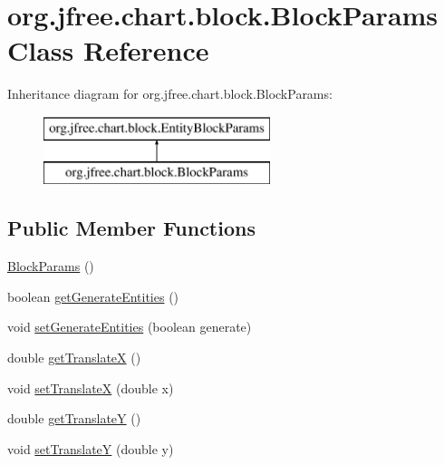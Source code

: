 \hypertarget{classorg_1_1jfree_1_1chart_1_1block_1_1_block_params}{}\section{org.\+jfree.\+chart.\+block.\+Block\+Params Class Reference}
\label{classorg_1_1jfree_1_1chart_1_1block_1_1_block_params}
Inheritance diagram for org.\+jfree.\+chart.\+block.\+Block\+Params\+:\begin{figure}[H]
\begin{center}
\leavevmode
\includegraphics[height=2.000000cm]{classorg_1_1jfree_1_1chart_1_1block_1_1_block_params}
\end{center}
\end{figure}
\subsection*{Public Member Functions}
\begin{DoxyCompactItemize}
\item 
\mbox{\hyperlink{classorg_1_1jfree_1_1chart_1_1block_1_1_block_params_a274dfbe74df7b75505cec4eb456b328c}{Block\+Params}} ()
\item 
boolean \mbox{\hyperlink{classorg_1_1jfree_1_1chart_1_1block_1_1_block_params_a5e6834d032c280d81a98ce45f615d231}{get\+Generate\+Entities}} ()
\item 
void \mbox{\hyperlink{classorg_1_1jfree_1_1chart_1_1block_1_1_block_params_a66ea957ee6b80277218fc7fa382026a4}{set\+Generate\+Entities}} (boolean generate)
\item 
double \mbox{\hyperlink{classorg_1_1jfree_1_1chart_1_1block_1_1_block_params_aad14cc6a094bce857c9959fee9e2efe6}{get\+TranslateX}} ()
\item 
void \mbox{\hyperlink{classorg_1_1jfree_1_1chart_1_1block_1_1_block_params_aeed14a7eaf248e4f312a80c4e5357194}{set\+TranslateX}} (double x)
\item 
double \mbox{\hyperlink{classorg_1_1jfree_1_1chart_1_1block_1_1_block_params_a7bee0137374f607f203c0a20d2c35ff7}{get\+TranslateY}} ()
\item 
void \mbox{\hyperlink{classorg_1_1jfree_1_1chart_1_1block_1_1_block_params_a0b256b84430909bc2643998c54e4a0ad}{set\+TranslateY}} (double y)
\end{DoxyCompactItemize}



